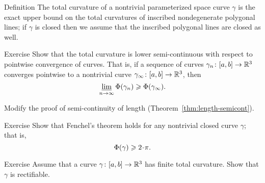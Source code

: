 \begin{thm}{Definition}\label{def:total-curv-poly}
The total curvature of a nontrivial parameterized space curve $\gamma$ is the exact upper bound on the total curvatures of inscribed nondegenerate polygonal lines;
if $\gamma$ is closed then we assume that the inscribed polygonal lines are closed as well.
\end{thm}


\begin{thm}{Exercise}
Show that the total curvature is lower semi-continuous with respect to pointwise convergence of curves.
That is, if a sequence
of curves $\gamma_n\colon[a,b]\to \mathbb{R}^3$ converges pointwise 
to a nontrivial curve $\gamma_\infty\:[a,b]\z\to \RR^3$, then 
\[\varliminf_{n\to\infty} \Phi({\gamma_n}) \geqslant \Phi({\gamma_\infty}).\]
\end{thm}

 Modify the proof of semi-continuity of length (Theorem~\ref{thm:length-semicont}).

\begin{thm}{Exercise}
Show that Fenchel's theorem holds for any nontrivial closed curve $\gamma$;
that is, 
\[\tc\gamma\ge2\cdot\pi.\]
\end{thm}

\begin{thm}{Exercise} 
Assume that a curve $\gamma\colon[a,b]\to\mathbb{R}^3$ has finite total curvature.
 Show that $\gamma$ is rectifiable.
\end{thm}

